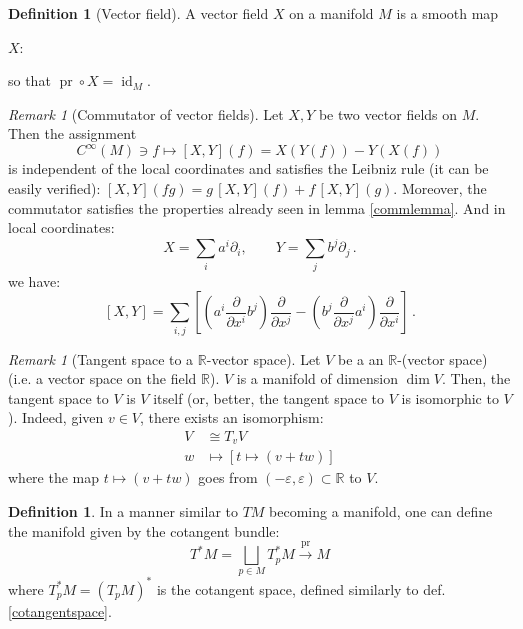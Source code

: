 \documentclass[a4paper,11pt,titlepage, article, oneside]{memoir}
\numberwithin{equation}{section}
\theoremstyle{definition}
\newtheorem{definition}[theorem]{Definition}
\theoremstyle{remark}
\newtheorem{remark}[theorem]{Remark}
\DeclareMathOperator{\id}{id}
\DeclareMathOperator{\pr}{pr}
\newcommand{\rfield}{\mathbb{R}}
\newcommand{\deonde}[1]{\frac{\partial}{\partial {#1}}}
\begin{document}
\begin{definition}[Vector field]
A vector field $X$ on a manifold $M$ is a smooth map
\begin{center}
$X \colon$
\end{center}
so that $\pr \circ X = \id_M$.
\end{definition}

\begin{remarkbox}\begin{remark} [Commutator of vector fields]
Let $X, Y$ be two vector fields on $M$. Then the assignment 
\begin{equation*}
C^{\infty}(M) \ni f \longmapsto [X, Y](f) = X \left(Y(f)\right) - Y \left(X(f)\right)
\end{equation*}
is independent of the local coordinates  and satisfies the Leibniz rule (it can be easily verified): $[X, Y](fg) = g\, [X, Y](f) + f \, [X, Y](g)$. Moreover, the commutator satisfies the properties already seen in lemma \ref{commlemma}. And in local coordinates: 
\[ X= \sum\limits_i a^i \partial_i, \qquad Y= \sum\limits_j b^j \partial_j \, . \]
we have:
\[ [X, Y] = \sum\limits_{i, j}\left[ \left (a^i \deonde{x^i} b^j \right) \deonde{x^j} - \left(b^j \deonde{x^j}a^i \right) \deonde{x^i} \right] \, . \]
\end{remark}\end{remarkbox}

\begin{remarkbox}\begin{remark}[Tangent space to a $\rfield$-vector space]
Let $V$ be a an $\rfield$-(vector space) (i.e. a vector space on the field $\rfield$). $V$ is a manifold of dimension $\dim V$. Then, the tangent space to $V$ is $V$ itself (or, better, the tangent space to $V$ is isomorphic to $V$). Indeed, given $v \in V$, there exists an isomorphism:
\begin{align*}
V &\cong T_v V \\
w &\mapsto \left[ t \mapsto (v + tw)\right]
\end{align*}
where the map $t \mapsto (v + tw)$ goes from $(-\varepsilon, \varepsilon) \subset \rfield$ to $V$.
\end{remark}\end{remarkbox}

\begin{definition}
In a manner similar to $TM$ becoming a manifold, one can define the manifold given by the cotangent bundle:
\begin{equation}
T^*M = \bigsqcup_{p \in M} T_p^*M \overset{\pr}{\longrightarrow} M
\end{equation}
where $T^*_pM = (T_pM)^*$ is the cotangent space, defined similarly to def. \ref{cotangentspace}.
\end{definition}
\end{document}
